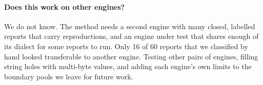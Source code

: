 \paragraph{Does this work on other engines?} We do not know. The method needs a
second engine with many closed, labelled reports that carry reproductions, and
an engine under test that shares enough of its dialect for some reports to run.
Only 16 of 60 reports that we classified by hand looked transferable to another
engine. Testing other pairs of engines, filling string holes with multi-byte
values, and adding each engine's own limits to the boundary pools we leave for
future work.
